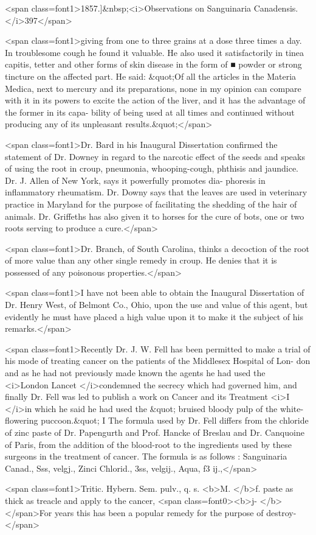 <span class=font1>1857.]&nbsp;<i>Observations on Sanguinaria Canadensis. </i>397</span>

<span class=font1>giving from one to three grains at a dose three times a day. In
troublesome cough he found it valuable. He also used it satisfactorily
in tinea capitis, tetter and other forms of skin disease in the form of
■ powder or strong tincture on the affected part. He said: &quot;Of all
the articles in the Materia Medica, next to mercury and its preparations,
none in my opinion can compare with it in its powers to excite the
action of the liver, and it has the advantage of the former in its capa-
bility of being used at all times and continued without producing any
of its unpleasant results.&quot;</span>

<span class=font1>Dr. Bard in his Inaugural Dissertation confirmed the statement of
Dr. Downey in regard to the narcotic effect of the seeds and speaks
of using the root in croup, pneumonia, whooping-cough, phthisis and
jaundice. Dr. J. Allen of New York, says it powerfully promotes dia-
phoresis in inflammatory rheumatism. Dr. Downy says that the leaves
are used in veterinary practice in Maryland for the purpose of facilitating
the shedding of the hair of animals. Dr. Griffeths has also given it to
horses for the cure of bots, one or two roots serving to produce a cure.</span>

<span class=font1>Dr. Branch, of South Carolina, thinks a decoction of the root of
more value than any other single remedy in croup. He denies that it
is possessed of any poisonous properties.</span>

<span class=font1>I have not been able to obtain the Inaugural Dissertation of Dr.
Henry West, of Belmont Co., Ohio, upon the use and value of this
agent, but evidently he must have placed a high value upon it to make
it the subject of his remarks.</span>

<span class=font1>Recently Dr. J. W. Fell has been permitted to make a trial of his
mode of treating cancer on the patients of the Middlesex Hospital of Lon-
don and as he had not previously made known the agents he had used
the <i>London Lancet </i>condemned the secrecy which had governed him, and
finally Dr. Fell was led to publish a work on Cancer and its Treatment
<i>I   </i>in which he said he had used the &quot; bruised bloody pulp of the white-
flowering puccoon.&quot;
I      The formula used by Dr. Fell differs from the chloride of zinc
paste of Dr. Papengurth and Prof. Hancke of Breslau and Dr. Canquoine
of Paris, from the addition of the blood-root to the ingredients used by
these surgeons in the treatment of cancer.   The formula is as follows :
Sanguinaria Canad., Sss, velgj.,
Zinci Chlorid., 3ss, velgij.,
Aqua, f3 ij.,</span>

<span class=font1>Tritic. Hybern. Sem. pulv., q. s.
<b>M. </b>f. paste as thick as treacle and apply to the cancer,
<span class=font0><b>j-      </b></span>For years this has been a popular remedy for the purpose of destroy-</span>
